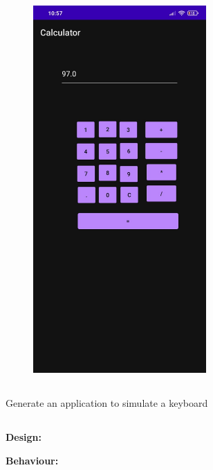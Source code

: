 \documentclass[12pt,letterpaper]{article}
\begin{document}
\begin{figure}
    \centering
    \includegraphics[height=14cm, keepaspectratio]{Calculator/Outputs/OP3.jpeg}
\end{figure}

\newpage

\subsection*{}
\begin{flushleft}
    Generate an application to simulate a keyboard  
\end{flushleft}

\subsection*{}

\subsubsection*{}
\textbf{Design:}
\begin{flushleft}

\end{flushleft}
\textbf{Behaviour:}
\begin{flushleft}

\end{flushleft}
\end{document}
